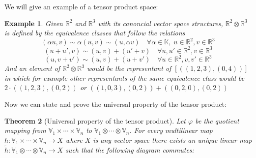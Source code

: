 \documentclass[11pt,a4paper,openright,oneside]{book}
\numberwithin{equation}{section}
\newtheorem{defn0}{Definition}[chapter]
\newtheorem{thm0}[defn0]{Theorem}
\newtheorem{example0}[defn0]{Example}
\newenvironment{definition}{ \begin{defn0}}{\end{defn0}}
\newenvironment{theorem}{\bigskip \begin{thm0}}{\end{thm0}}
\newenvironment{example}{ \begin{example0}\rm}{\end{example0}}
\begin{document}
We will give an example of a tensor product space:

\begin{example}
    Given $\mathbb{R}^2$ and $\mathbb{R}^3$ with its canoncial vector space
    structures, $\mathbb{R}^2 \otimes \mathbb{R}^3$ is defined by the equivalence classes that follow the relations
    $$(\alpha u, v) \sim \alpha (u, v) \sim (u, \alpha v) \quad \forall \alpha \in \mathbb{K}, \; u \in \mathbb{R}^2, v \in \mathbb{R}^3$$
    $$(u + u', v) \sim (u, v) + (u' + v) \quad \forall u, u' \in \mathbb{R}^2, v \in \mathbb{R}^3$$
    $$(u, v + v') \sim (u, v) + (u + v') \quad \forall u \in \mathbb{R}^2, v, v' \in \mathbb{R}^3$$
    And an element of $\mathbb{R}^2 \otimes \mathbb{R}^3$ would be the representant of $[((1, 2, 3), (0, 4))]$ in which
    for example other representants of the same equivalence class would be $2 \cdot ((1,2,3), (0, 2))$ or ${((1, 0, 3), (0, 2)) + ((0,2,0), (0, 2))}$
\end{example}
Now we can state and prove the universal property of the tensor product:
\begin{theorem}[Universal property of the tensor product]
    Let $\varphi$ be the quotient mapping from $\mathbb{V}_1 \times \cdots \times \mathbb{V}_n$ to $\mathbb{V}_1 \otimes \cdots \otimes \mathbb{V}_n$. 
    For every multilinear map $h: \mathbb{V}_1 \times \cdots \times \mathbb{V}_n \rightarrow X$ where $X$ is any vector space there exists an unique linear map 
    $\tilde{h}: \mathbb{V}_1 \otimes \cdots \otimes \mathbb{V}_n \rightarrow X$ such that the following diagram commutes:

    \centering

\end{theorem}
\end{document}
